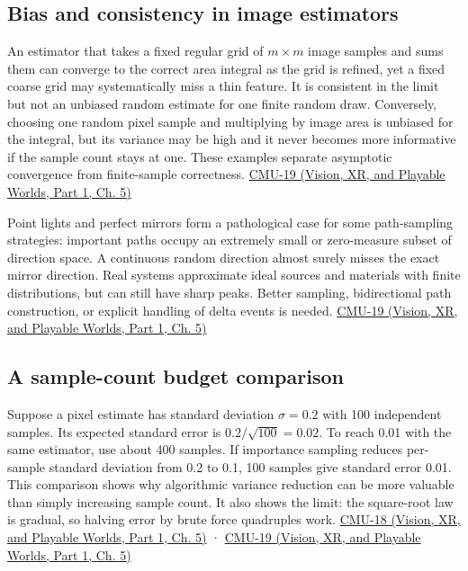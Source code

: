 \subsection{Bias and consistency in image estimators}\label{03-visual-computing-i-ch012-bias-and-consistency-in-image-estimators}

\hypertarget{03-visual-computing-i-ch012-bias-and-consistency-in-image-estimators}{}

An estimator that takes a fixed regular grid of \(m\times m\) image samples and sums them can converge to the correct area integral as the grid is refined, yet a fixed coarse grid may systematically miss a thin feature. It is consistent in the limit but not an unbiased random estimate for one finite random draw. Conversely, choosing one random pixel sample and multiplying by image area is unbiased for the integral, but its variance may be high and it never becomes more informative if the sample count stays at one. These examples separate asymptotic convergence from finite-sample correctness. \href{../07-Vision-XR-and-Playable-Worlds-P01/main.pdf\#04-visual-computing-ii-ch036-cmu-19---variance-reduction}{CMU-19 (Vision, XR, and Playable Worlds, Part 1, Ch. 5)}

Point lights and perfect mirrors form a pathological case for some path-sampling strategies: important paths occupy an extremely small or zero-measure subset of direction space. A continuous random direction almost surely misses the exact mirror direction. Real systems approximate ideal sources and materials with finite distributions, but can still have sharp peaks. Better sampling, bidirectional path construction, or explicit handling of delta events is needed. \href{../07-Vision-XR-and-Playable-Worlds-P01/main.pdf\#04-visual-computing-ii-ch036-cmu-19---variance-reduction}{CMU-19 (Vision, XR, and Playable Worlds, Part 1, Ch. 5)}

\subsection{A sample-count budget comparison}\label{03-visual-computing-i-ch012-a-sample-count-budget-comparison}

\hypertarget{03-visual-computing-i-ch012-a-sample-count-budget-comparison}{}

Suppose a pixel estimate has standard deviation \(\sigma=0.2\) with 100 independent samples. Its expected standard error is \(0.2/\sqrt{100}=0.02\). To reach 0.01 with the same estimator, use about 400 samples. If importance sampling reduces per-sample standard deviation from 0.2 to 0.1, 100 samples give standard error 0.01. This comparison shows why algorithmic variance reduction can be more valuable than simply increasing sample count. It also shows the limit: the square-root law is gradual, so halving error by brute force quadruples work. \href{../07-Vision-XR-and-Playable-Worlds-P01/main.pdf\#04-visual-computing-ii-ch036-cmu-18---monte-carlo-rendering}{CMU-18 (Vision, XR, and Playable Worlds, Part 1, Ch. 5)} · \href{../07-Vision-XR-and-Playable-Worlds-P01/main.pdf\#04-visual-computing-ii-ch036-cmu-19---variance-reduction}{CMU-19 (Vision, XR, and Playable Worlds, Part 1, Ch. 5)}


